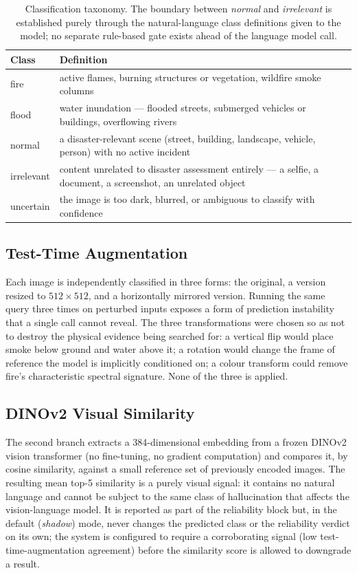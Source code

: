 \documentclass[11pt, a4paper]{article}
\begin{document}
\begin{table}[h]
\centering\small
\begin{tabular}{p{2.0cm}p{9.6cm}}
\toprule
\textbf{Class} & \textbf{Definition} \\
\midrule
fire       & active flames, burning structures or vegetation, wildfire smoke columns \\
flood      & water inundation --- flooded streets, submerged vehicles or buildings, overflowing rivers \\
normal     & a disaster-relevant scene (street, building, landscape, vehicle, person) with no active incident \\
irrelevant & content unrelated to disaster assessment entirely --- a selfie, a document, a screenshot, an unrelated object \\
uncertain  & the image is too dark, blurred, or ambiguous to classify with confidence \\
\bottomrule
\end{tabular}
\caption{Classification taxonomy. The boundary between \emph{normal} and \emph{irrelevant} is
established purely through the natural-language class definitions given to the model; no
separate rule-based gate exists ahead of the language model call.}
\label{tab:taxonomy}
\end{table}

\subsection{Test-Time Augmentation}

Each image is independently classified in three forms: the original, a version resized to
$512\times512$, and a horizontally mirrored version. Running the same query three times on
perturbed inputs exposes a form of prediction instability that a single call cannot reveal. The
three transformations were chosen so as not to destroy the physical evidence being searched
for: a vertical flip would place smoke below ground and water above it; a rotation would change
the frame of reference the model is implicitly conditioned on; a colour transform could remove
fire's characteristic spectral signature. None of the three is applied.

\subsection{DINOv2 Visual Similarity}

The second branch extracts a 384-dimensional embedding from a frozen DINOv2 vision transformer
(no fine-tuning, no gradient computation) and compares it, by cosine similarity, against a
small reference set of previously encoded images. The resulting mean top-5 similarity is a
purely visual signal: it contains no natural language and cannot be subject to the same class
of hallucination that affects the vision-language model. It is reported as part of the
reliability block but, in the default (\emph{shadow}) mode, never changes the predicted class
or the reliability verdict on its own; the system is configured to require a corroborating
signal (low test-time-augmentation agreement) before the similarity score is allowed to
downgrade a result.
\end{document}
